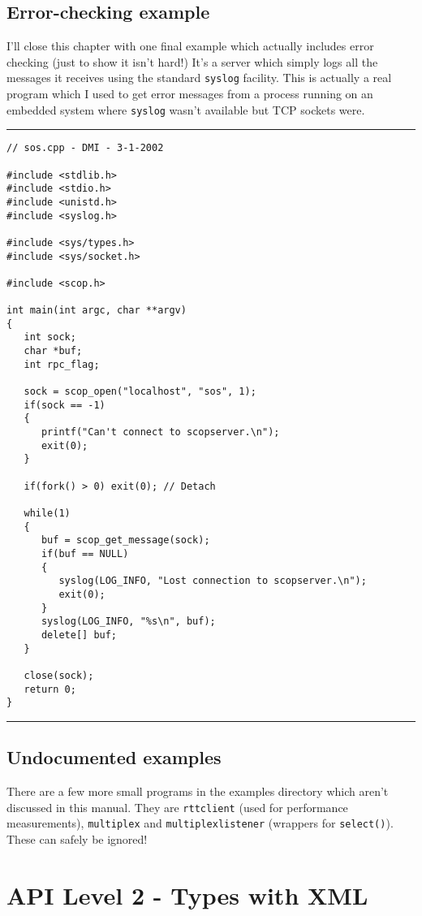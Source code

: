 \documentclass[12pt,a4paper,twoside]{article}
\renewcommand{\_}{\texttt{\symbol{95}}}
\newcommand{\codebar}{\rule{\textwidth}{0.3mm}}
\begin{document}
\subsection*{Error-checking example}

I'll close this chapter with one final example which actually
includes error checking (just to show it isn't hard!)
It's a server which simply logs all the messages it receives
using the standard \texttt{syslog} facility.
This is actually a real program which I used to get error
messages from a process running on an embedded system where
\texttt{syslog} wasn't available but TCP sockets were.

\codebar
\small
\begin{verbatim}
// sos.cpp - DMI - 3-1-2002

#include <stdlib.h>
#include <stdio.h>
#include <unistd.h>
#include <syslog.h>

#include <sys/types.h>
#include <sys/socket.h>

#include <scop.h>

int main(int argc, char **argv)
{
   int sock;
   char *buf;
   int rpc_flag;

   sock = scop_open("localhost", "sos", 1);
   if(sock == -1)
   {
      printf("Can't connect to scopserver.\n");
      exit(0);
   }
   
   if(fork() > 0) exit(0); // Detach
   
   while(1)
   {
      buf = scop_get_message(sock);
      if(buf == NULL)
      {
         syslog(LOG_INFO, "Lost connection to scopserver.\n");
         exit(0);
      }
      syslog(LOG_INFO, "%s\n", buf);
      delete[] buf;
   }
   
   close(sock);
   return 0;
}
\end{verbatim}
\normalsize
\codebar

\subsection{Undocumented examples}

There are a few more small programs in the examples directory which
aren't discussed in this manual. They are \texttt{rtt\_client} (used
for performance measurements), \texttt{multiplex} and
\texttt{multiplex\_listener} (wrappers for \texttt{select()}).
These can safely be ignored!

\section{API Level 2 - Types with XML}
\end{document}
